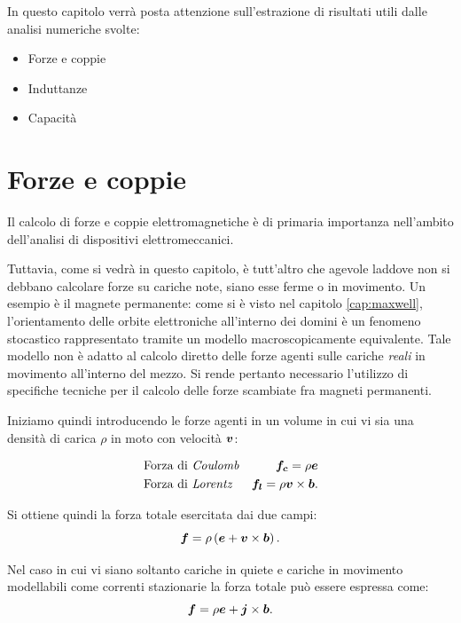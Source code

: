 


\label{cap:output}
In questo capitolo verrà posta attenzione sull'estrazione di risultati utili dalle analisi numeriche svolte:
\begin{itemize}
\item Forze e coppie
\item Induttanze
\item Capacità
\end{itemize}
\section{Forze e coppie}
Il calcolo di forze e coppie elettromagnetiche è di primaria importanza nell'ambito dell'analisi di dispositivi elettromeccanici. 

Tuttavia, come si vedrà in questo capitolo, è tutt'altro che agevole laddove non si debbano calcolare forze su cariche note, siano esse ferme o in movimento. 
Un esempio è il magnete permanente: come si è visto nel capitolo \ref{cap:maxwell}, l'orientamento delle orbite elettroniche all'interno dei domini è un fenomeno stocastico rappresentato tramite un modello macroscopicamente equivalente. Tale modello non è adatto al calcolo diretto delle forze agenti sulle cariche \textit{reali} in movimento all'interno del mezzo. Si rende pertanto necessario l'utilizzo di specifiche tecniche per il calcolo delle forze scambiate fra magneti permanenti.

Iniziamo quindi introducendo le forze agenti in un volume in cui vi sia una densità di carica $\rho$ in moto con velocità $\boldsymbol{v}$:

\begin{align}
\label{eq:5coulombf}
&\text{Forza di \textit{Coulomb}} &\boldsymbol{f_c}=\rho \boldsymbol{e}  \\
\label{eq:5lorentzf}
&\text{Forza di \textit{Lorentz}}&\boldsymbol{f_l}=\rho \boldsymbol{v}\times \boldsymbol{b} .
\end{align}

Si ottiene quindi la forza totale esercitata dai due campi:
\begin{equation}
\label{eq:5ftot1}
\boldsymbol{f}=\rho \left(\boldsymbol{e}+\boldsymbol{v}\times \boldsymbol{b}\right).
\end{equation}

Nel caso in cui vi siano soltanto cariche in quiete e cariche in movimento modellabili come correnti stazionarie la forza totale può essere espressa come:
\begin{equation}
\label{eq:5ftot2}
\boldsymbol{f}=\rho\boldsymbol{e} +\boldsymbol{j}\times \boldsymbol{b}.
\end{equation}


